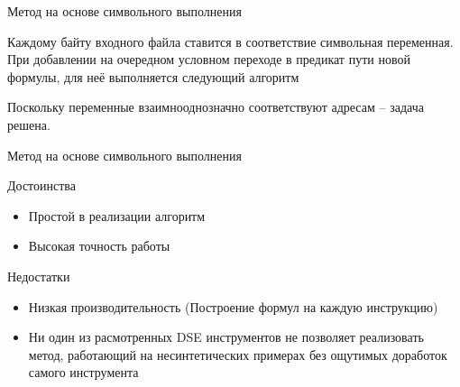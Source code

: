 \documentclass[10pt]{beamer}
\begin{document}
\begin{frame}{Метод на основе символьного выполнения}

Каждому байту входного файла ставится в соответствие символьная переменная.
При добавлении на очередном условном переходе в предикат пути новой формулы, для неё выполняется следующий алгоритм

\begin{algorithm}[H]
\SetAlgoLined
{}
  \caption{Метод на основе символьного выполнения}
\end{algorithm}
Поскольку переменные взаимнооднозначно соответствуют адресам -- задача решена.
\end{frame}


\begin{frame}{Метод на основе символьного выполнения}

  \begin{block}{Достоинства}
    \begin{itemize}
      \item Простой в реализации алгоритм
      \item Высокая точность работы
    \end{itemize}
  \end{block}
  \pause
  \begin{block}{Недостатки}
    \begin{itemize}
      \item Низкая производительность (Построение формул на каждую инструкцию)
      \item Ни один из расмотренных DSE инструментов не позволяет реализовать метод, работающий на несинтетических примерах без ощутимых доработок самого инструмента
    \end{itemize}
  \end{block}

\end{frame}
\end{document}
